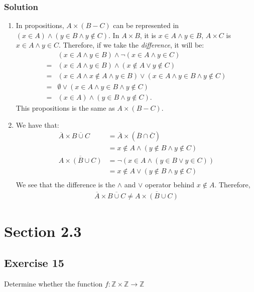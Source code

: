 \documentclass{article}
\theoremstyle{mytheoremstyle}
\theoremstyle{mytheoremstyle}
\theoremstyle{myproblemstyle}
\begin{document}
    \subsubsection*{Solution}
        \begin{enumerate} [label = (\alph*)]
            \item In propositions, \(A \times (B - C)\) can be represented in \((x \in A) \land (y \in B \land y \notin C)\).
            In \(A \times B\), it is \(x \in A \land y \in B\), \(A \times C\) is \(x \in A \land y \in C\). Therefore,
            if we take the \textit{difference}, it will be:
            \begin{align*}
                &(x \in A \land y \in B) \land \lnot(x \in A \land y \in C)\\
                = &(x \in A \land y \in B) \land (x \notin A \lor y \notin C)\\
                = &(x \in A \land x \notin A \land y \in B) \lor (x \in A \land y \in B \land y \notin C)\\
                = & \emptyset \lor (x \in A \land y \in B \land y \notin C)\\
                = & (x \in A) \land (y \in B \land y \notin C).
            \end{align*}
        This propositions is the same as \(A \times (B - C)\).
            \item We have that:
                \begin{align*}
                    \overline{A} \times \overline{B \cup C} &= \overline{A} \times (\overline{B} \cap \overline{C})\\
                    &= x \notin A \land (y \notin B \land y \notin C)\\
                    \overline{A \times (B \cup C)} &= \lnot(x \in A \land (y \in B \lor y \in C))\\
                    &= x \notin A \lor (y \notin B \land y \notin C)\\
                \end{align*}
            We see that the difference is the \(\land\) and \(\lor\) operator behind \(x \notin A\). Therefore,
            \begin{align*}
                \overline{A} \times \overline{B \cup C} \neq \overline{A \times (B \cup C)}
            \end{align*}
        \end{enumerate}
    \section*{Section 2.3}
    \subsection*{Exercise 15}
        Determine whether the function \(f: \mathbb{Z} \times \mathbb{Z} \to \mathbb{Z}\)
\end{document}
